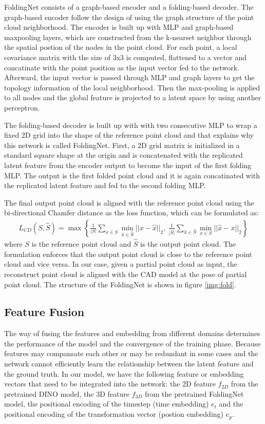 \documentclass[12pt,DIV14,BCOR12mm,a4paper,footinclude=false,headinclude,parskip=half-,twoside,openright,cleardoublepage=empty,toc=index,bibliography=totoc,listof=totoc]{scrreprt}
\numberwithin{equation}{chapter}
\begin{document}
FoldingNet consists of a graph-based encoder and a folding-based decoder. The graph-based encoder follow the design of \cite{shen2018mining} using the graph structure of the point cloud neighborhood. The encoder is built up with MLP and graph-based maxpooling layers, which are constructed from the k-nearset neighbor through the spatial postion of the nodes in the point cloud. For each point, a local covariance matrix with the size of 3x3 is computed, flattened to a vector and concatinate with the point position as the input vector fed to the network. Afterward, the input vector is passed through MLP and graph layers to get the topology information of the local neighborhood. Then the max-pooling is applied to all nodes and the global feature is projected to a latent space by using another perceptron.

The folding-based decoder is built up with with two consecutive MLP to wrap a fixed 2D grid into the shape of the reference point cloud and that explains why this network is called FoldingNet. First, a 2D grid matrix is initialized in a standard square shape at the origin and is concatenated with the replicated latent feature from the encoder output to become the input of the first folding MLP. The output is the first folded point cloud and it is again concatinated with the replicated latent feature and fed to the second folding MLP.

The final output point cloud is aligned with the reference point cloud using the bi-directional Chamfer distance as the loss function, which can be formulated as:
\begin{align}\label{eq:cd}
  L_{CD}(S, \hat{S}) = \max \left\{\frac{1}{\lvert S\rvert }\mathop{\sum}_{x\in S} \mathop{\min}_{\hat{x}\in \hat{S}}||x-\hat{x}||_{2} ,\ \frac{1}{\lvert \hat{S}\rvert }\mathop{\sum}_{\hat{x}\in \hat{S}} \mathop{\min}_{x\in S}||\hat{x}-x||_{2}\right\}
\end{align}
where $S$ is the reference point cloud and $\hat{S}$ is the output point cloud. The formulation enforces that the output point cloud is close to the reference point cloud and vice versa. In our case, given a partial point cloud as input, the reconstruct point cloud is aligned with the CAD model at the pose of partial point cloud. The structure of the FoldingNet is shown in figure \ref{img:fold}.

\subsection{Feature Fusion}\label{sec:fusion}
The way of fusing the features and embedding from different domains determines the performance of the model and the convergence of the training phase. Because features may compansate each other or may be redundant in some cases and the network cannot efficiently learn the relationship between the latent feature and the ground truth. In our model, we have the following feature or embedding vectors that need to be integrated into the network: the 2D feature $f_{2D}$ from the pretrained DINO model, the 3D feature $f_{3D}$ from the pretrained FoldingNet model, the positional encoding of the timestep (time embedding) $e_{t}$ and the positional encoding of the transformation vector (postion embedding) $e_{p}$.
\end{document}
